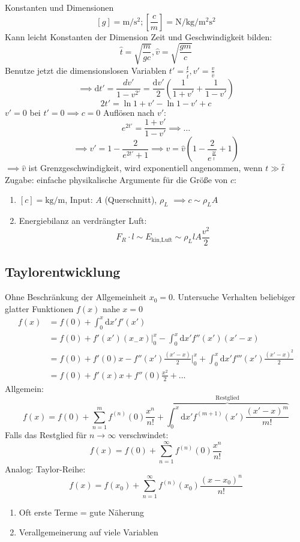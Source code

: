 \documentclass[a4paper]{scrartcl}
\renewcommand{\d}{\mathrm{d}}
\theoremstyle{definition}
\theoremstyle{plain}
\theoremstyle{remark}
\theoremstyle{remark}
\begin{document}
Konstanten und Dimensionen
\[[g] = \si{\meter\per\second\squared};[\frac{c}{m}] = \si{\newton\per\kilo\gram\per\meter\squared\second\squared}\]
Kann leicht Konstanten der Dimension Zeit und Geschwindigkeit bilden:
\[\hat{t} = \sqrt{\frac{m}{g c}},\hat{v} = \sqrt{\frac{g m}{c}}\]
Benutze jetzt die dimensionslosen Variablen $t' = \frac{t}{\hat{t}},v'=\frac{v}{\hat{v}}$
\[\implies \d t' = \frac{d v'}{1 - v^{2\prime}} = \frac{\d v'}{2}(\frac{1}{1 + v'} + \frac{1}{1 - v'})\]
\[2t' = \ln{1 + v'} - \ln{1 - v'} + c\]
$v' = 0$ bei $t' = 0 \implies c = 0$
Auflösen nach $v'$: \[e^{2t'} = \frac{1 + v'}{1 - v'} \implies \ldots\]
\[\implies v' = 1 - \frac{2}{e^{2t'} + 1} \implies v = \hat{v}(1 - \frac{2}{e^{\frac{2t}{\hat{t}}}} + 1)\]
$\implies \hat{v}$ ist Grenzgeschwindigkeit, wird exponentiell angenommen, wenn $t \gg \hat{t}$ \\

Zugabe: einfache physikalische Argumente für die Größe von $c$:
\begin{enumerate}
\item $[c] = \si{\kilo\gram\per\meter}$, Input: $A$ (Querschnitt), $\rho_L$
         $\implies c \sim \rho_L A$
\item Energiebilanz an verdrängter Luft: \[F_R\cdot l \sim E_{\text{kin,Luft}}\sim\rho_L l A \frac{v^2}{2}\]
\end{enumerate}
\subsection{Taylorentwicklung}
\label{sec-3-4}
Ohne Beschränkung der Allgemeinheit $x_0 = 0$. Untersuche Verhalten beliebiger glatter Funktionen $f(x)$ nahe $x = 0$
\begin{align*}
f(x) &= f(0) + \int_0^x\d x' f'(x') \\
&= f(0) + f'(x')(x_ - x)\Big|_0^x - \int_0^x\d x' f''(x')(x'-x) \\
&= f(0) + f'(0)x - f''(x')\frac{(x' - x)}{2}\Big|_0^x + \int_0^x\d x' f'''(x')\frac{(x' - x)^2}{2} \\
&= f(0) + f'(x)x + f''(0)\frac{x^2}{2} + \ldots
\end{align*}
Allgemein:
\[f(x) = f(0) + \sum_{n=1}^m f^{(n)}(0)\frac{x^n}{n!}+\overbrace{\int_0^x \d x' f^{(m+1)}(x')\frac{(x' - x)^m}{m!}}^{\text{Restglied}}\]
Falls das Restglied für $n\to\infty$ verschwindet:
\[f(x) = f(0) + \sum_{n=1}^\infty f^{(n)}(0)\frac{x^n}{n!}\]
Analog:
Taylor-Reihe: \[f(x) = f(x_0) + \sum_{n=1}^\infty f^{(n)}(x_0)\frac{(x - x_0)^n}{n!}\]
\begin{enumerate}
\item Oft erste Terme = gute Näherung
\item Verallgemeinerung auf viele Variablen
\end{enumerate}
\end{document}
